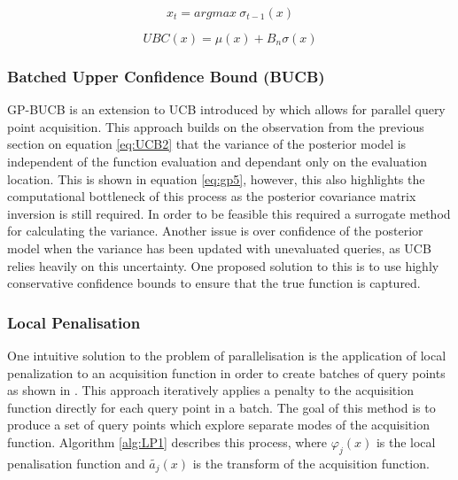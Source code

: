 \documentclass{article}
\begin{document}
			\begin{equation}\label{eq:UCB2} x_t = argmax ~\sigma_{t-1}(x) \end{equation}


			\begin{equation}\label{eq:UCB1} UBC(x) = \mu(x) + B_n\sigma(x) \end{equation}




		\subsubsection{Batched Upper Confidence Bound (BUCB)}\label{BUCB}

		GP-BUCB is an extension to UCB introduced by \cite{GP-BUCB} which allows for parallel query point acquisition. This approach builds on the observation from the previous section on equation \ref{eq:UCB2} that the variance of the posterior model is independent of the function evaluation and dependant only on the evaluation location. This is shown in equation \ref{eq:gp5}, however, this also highlights the computational bottleneck of this process as the posterior covariance matrix inversion is still required. In order to be feasible this required a surrogate method for calculating the variance. Another issue is over confidence of the posterior model when the variance has been updated with unevaluated queries, as UCB relies heavily on this uncertainty. One proposed solution to this is to use highly conservative confidence bounds to ensure that the true function is captured.\cite{GP-BUCB}




		\subsubsection{Local Penalisation}

			One intuitive solution to the problem of parallelisation is the application of local penalization to an acquisition function in order to create batches of query points as shown in \cite{37}. This approach iteratively applies a penalty to the acquisition function directly for each query point in a batch. The goal of this method is to produce a set of query points which explore separate modes of the acquisition function. Algorithm \ref{alg:LP1} describes this process, where \(\varphi_j(x)\) is the local penalisation function and \(\widetilde{a_j}(x)\) is the transform of the acquisition function.
			
			\par \(~\)
\end{document}
